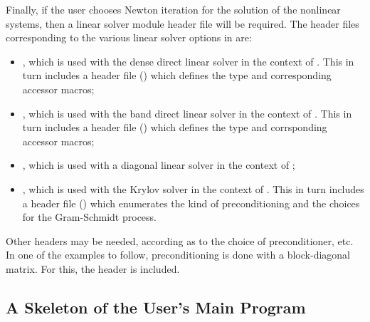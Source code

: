Finally, if the user chooses Newton iteration for the solution of the nonlinear systems,
then a linear solver module header file will be required. 
The header files corresponding to the various linear solver options in {\cvode} are:
%
\begin{itemize}
\item {}, 
  which is used with the dense direct linear solver in 
  the context of {\cvode}. This in turn includes a header file ()
  which defines the  type and corresponding accessor macros; 
\item {}, 
  which is used with the band direct linear solver in the
  context of {\cvode}. This in turn includes a header file ()
  which defines the  type and corrsponding accessor macros;
\item {}, which is used with a diagonal linear solver in the
  context of {\cvode};
\item {}, 
  which is used with the Krylov solver {\spgmr} in the
  context of {\cvode}. This in turn includes a header file ()
  which enumerates the kind of preconditioning and the choices for the
  Gram-Schmidt process.
\end{itemize}

Other headers may be needed, according as to the choice of
preconditioner, etc. In one of the examples to follow, preconditioning
is done with a block-diagonal matrix. For this, the header
 is included.


\subsection{A Skeleton of the User's Main Program}\label{ss:skeleton_sim}

